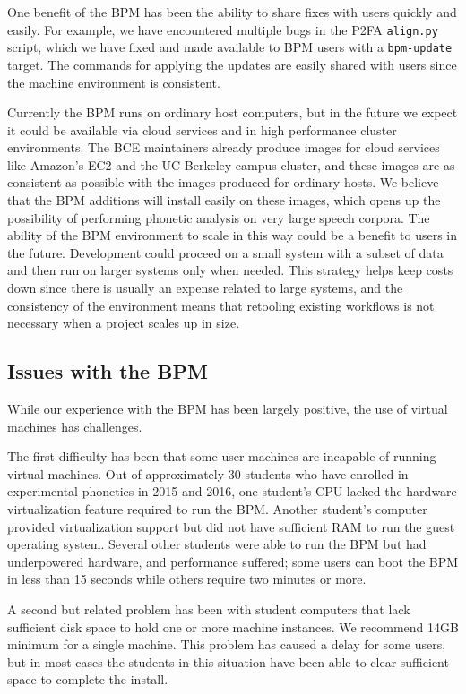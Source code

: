 \documentclass[a4paper]{article}
\begin{document}
  One benefit of the BPM has been the ability to share fixes with users quickly and easily. For example, we have encountered multiple bugs in the P2FA {\tt align.py} script, which we have fixed and made available to BPM users with a {\tt bpm-update} target. The commands for applying the updates are easily shared with users since the machine environment is consistent.

  Currently the BPM runs on ordinary host computers, but in the future we expect it could be available via cloud services and in high performance cluster environments. The BCE maintainers already produce images for cloud services like Amazon's EC2 and the UC Berkeley campus cluster, and these images are as consistent as possible with the images produced for ordinary hosts. We believe that the BPM additions will install easily on these images, which opens up the possibility of performing phonetic analysis on very large speech corpora. The ability of the BPM environment to scale in this way could be a benefit to users in the future. Development could proceed on a small system with a subset of data and then run on larger systems only when needed. This strategy helps keep costs down since there is usually an expense related to large systems, and the consistency of the environment means that retooling existing workflows is not necessary when a project scales up in size.

    \subsection{Issues with the BPM}
    While our experience with the BPM has been largely positive, the use of virtual machines has challenges.

  The first difficulty has been that some user machines are incapable of running virtual machines. Out of approximately 30 students who have enrolled in experimental phonetics in 2015 and 2016, one student's CPU lacked the hardware virtualization feature required to run the BPM. Another student's computer provided virtualization support but did not have sufficient RAM to run the guest operating system. Several other students were able to run the BPM but had underpowered hardware, and performance suffered; some users can boot the BPM in less than 15 seconds while others require two minutes or more.

  A second but related problem has been with student computers that lack sufficient disk space to hold one or more machine instances. We recommend 14GB minimum for a single machine. This problem has caused a delay for some users, but in most cases the students in this situation have been able to clear sufficient space to complete the install.
\end{document}
